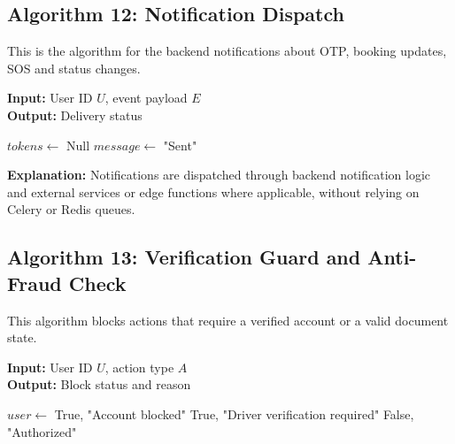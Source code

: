 \subsection{Algorithm 12: Notification Dispatch}

This is the algorithm for the backend notifications about OTP, booking updates, SOS and status changes.

\begin{breakablealgorithm}
\caption{Notification Dispatch}
\textbf{Input:} User ID $U$, event payload $E$ \\
\textbf{Output:} Delivery status
\begin{algorithmic}[1]
    \State $tokens \gets$ 
        \State \Return Null
    \EndIf
    \State $message \gets$ 
    \State {}
    \State \Return "Sent"
\EndFunction
\end{algorithmic}
\end{breakablealgorithm}

\textbf{Explanation:} Notifications are dispatched through backend notification logic and external services or edge functions where applicable, without relying on Celery or Redis queues.

\subsection{Algorithm 13: Verification Guard and Anti-Fraud Check}

This algorithm blocks actions that require a verified account or a valid document state.

\begin{breakablealgorithm}
\small
\caption{Identity Verification Guard}
\textbf{Input:} User ID $U$, action type $A$ \\
\textbf{Output:} Block status and reason
\begin{algorithmic}[1]
    \State $user \gets$ 
        \State \Return True, "Account blocked"
    \EndIf
        \State \Return True, "Driver verification required"
    \EndIf
    \State \Return False, "Authorized"
\EndFunction
\end{algorithmic}
\end{breakablealgorithm}

